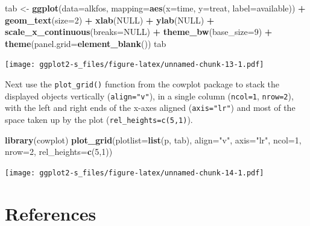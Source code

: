 \documentclass[
]{book}
\newenvironment{Shaded}{\begin{snugshade}}{\end{snugshade}}
\newcommand{\AttributeTok}[1]{\textcolor[rgb]{0.13,0.29,0.53}{#1}}
\newcommand{\ConstantTok}[1]{\textcolor[rgb]{0.56,0.35,0.01}{#1}}
\newcommand{\DecValTok}[1]{\textcolor[rgb]{0.00,0.00,0.81}{#1}}
\newcommand{\FunctionTok}[1]{\textcolor[rgb]{0.13,0.29,0.53}{\textbf{#1}}}
\newcommand{\NormalTok}[1]{#1}
\newcommand{\OtherTok}[1]{\textcolor[rgb]{0.56,0.35,0.01}{#1}}
\newcommand{\SpecialCharTok}[1]{\textcolor[rgb]{0.81,0.36,0.00}{\textbf{#1}}}
\newcommand{\StringTok}[1]{\textcolor[rgb]{0.31,0.60,0.02}{#1}}
\begin{document}
\begin{Shaded}
\begin{Highlighting}[]
\NormalTok{tab }\OtherTok{\textless{}{-}} \FunctionTok{ggplot}\NormalTok{(}\AttributeTok{data=}\NormalTok{alkfos, }
              \AttributeTok{mapping=}\FunctionTok{aes}\NormalTok{(}\AttributeTok{x=}\NormalTok{time, }\AttributeTok{y=}\NormalTok{treat, }\AttributeTok{label=}\NormalTok{available)) }\SpecialCharTok{+}
              \FunctionTok{geom\_text}\NormalTok{(}\AttributeTok{size=}\DecValTok{2}\NormalTok{) }\SpecialCharTok{+} \FunctionTok{xlab}\NormalTok{(}\ConstantTok{NULL}\NormalTok{) }\SpecialCharTok{+} \FunctionTok{ylab}\NormalTok{(}\ConstantTok{NULL}\NormalTok{) }\SpecialCharTok{+}
              \FunctionTok{scale\_x\_continuous}\NormalTok{(}\AttributeTok{breaks=}\ConstantTok{NULL}\NormalTok{) }\SpecialCharTok{+} 
              \FunctionTok{theme\_bw}\NormalTok{(}\AttributeTok{base\_size=}\DecValTok{9}\NormalTok{) }\SpecialCharTok{+}
              \FunctionTok{theme}\NormalTok{(}\AttributeTok{panel.grid=}\FunctionTok{element\_blank}\NormalTok{())}
\NormalTok{tab}
\end{Highlighting}
\end{Shaded}

\texttt{[image: ggplot2-s\_files/figure-latex/unnamed-chunk-13-1.pdf]}

Next use the \texttt{plot\_grid()} function from the cowplot package to stack the displayed objects vertically (\texttt{align="v"}), in a single column (\texttt{ncol=1}, \texttt{nrow=2}), with the left and right ends of the x-axes aligned (\texttt{axis="lr"}) and most of the space taken up by the plot (\texttt{rel\_heights=c(5,1)}).

\begin{Shaded}
\begin{Highlighting}[]
\FunctionTok{library}\NormalTok{(cowplot)}
\FunctionTok{plot\_grid}\NormalTok{(}\AttributeTok{plotlist=}\FunctionTok{list}\NormalTok{(p, tab), }\AttributeTok{align=}\StringTok{"v"}\NormalTok{, }\AttributeTok{axis=}\StringTok{"lr"}\NormalTok{, }
          \AttributeTok{ncol=}\DecValTok{1}\NormalTok{, }\AttributeTok{nrow=}\DecValTok{2}\NormalTok{, }\AttributeTok{rel\_heights=}\FunctionTok{c}\NormalTok{(}\DecValTok{5}\NormalTok{,}\DecValTok{1}\NormalTok{))}
\end{Highlighting}
\end{Shaded}

\texttt{[image: ggplot2-s\_files/figure-latex/unnamed-chunk-14-1.pdf]}

\section{References}\label{references}
\end{document}
